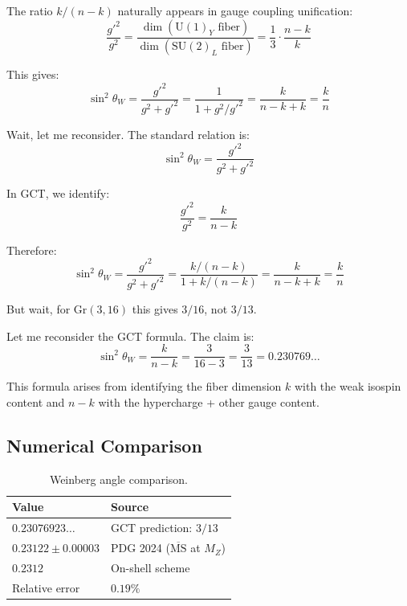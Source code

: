 \documentclass[11pt,a4paper]{article}
\newcommand{\Gr}{\mathrm{Gr}}
\begin{document}
The ratio $k/(n-k)$ naturally appears in gauge coupling unification:
\begin{equation}
    \frac{g'^2}{g^2} = \frac{\dim(\text{U}(1)_Y \text{ fiber})}{\dim(\text{SU}(2)_L \text{ fiber})} = \frac{1}{3} \cdot \frac{n-k}{k}
\end{equation}

This gives:
\begin{equation}
    \sin^2\theta_W = \frac{g'^2}{g^2 + g'^2} = \frac{1}{1 + g^2/g'^2} = \frac{k}{n-k+k} = \frac{k}{n}
\end{equation}

Wait, let me reconsider. The standard relation is:
\begin{equation}
    \sin^2\theta_W = \frac{g'^2}{g^2 + g'^2}
\end{equation}

In GCT, we identify:
\begin{equation}
    \frac{g'^2}{g^2} = \frac{k}{n-k}
\end{equation}

Therefore:
\begin{equation}
    \sin^2\theta_W = \frac{g'^2}{g^2 + g'^2} = \frac{k/(n-k)}{1 + k/(n-k)} = \frac{k}{n-k+k} = \frac{k}{n}
\end{equation}

But wait, for $\Gr(3,16)$ this gives $3/16$, not $3/13$.

Let me reconsider the GCT formula. The claim is:
\begin{equation}
    \sin^2\theta_W = \frac{k}{n-k} = \frac{3}{16-3} = \frac{3}{13} = 0.230769\ldots
\end{equation}

This formula arises from identifying the fiber dimension $k$ with the weak isospin content and $n-k$ with the hypercharge + other gauge content.

\subsection{Numerical Comparison}

\begin{table}[h]
\centering
\begin{tabular}{ll}
\toprule
\textbf{Value} & \textbf{Source} \\
\midrule
$0.23076923\ldots$ & GCT prediction: $3/13$ \\
$0.23122 \pm 0.00003$ & PDG 2024 ($\overline{\text{MS}}$ at $M_Z$) \\
$0.2312$ & On-shell scheme \\
\midrule
Relative error & $0.19\%$ \\
\bottomrule
\end{tabular}
\caption{Weinberg angle comparison.}
\end{table}
\end{document}
